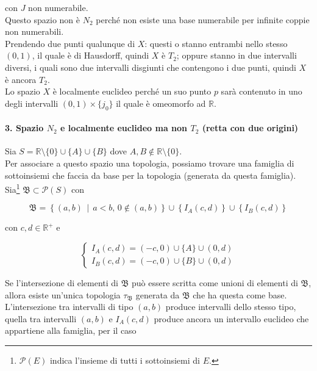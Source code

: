 con $ J $ non numerabile.\\
Questo spazio non è $ N_{2} $ perché non esiste una base numerabile per infinite coppie non numerabili.\\
Prendendo due punti qualunque di $ X $: questi o stanno entrambi nello stesso $ (0,1) $, il quale è di Hausdorff, quindi $ X $ è $ T_{2} $; oppure stanno in due intervalli diversi, i quali sono due intervalli disgiunti che contengono i due punti, quindi $ X $ è ancora $ T_{2} $.\\
Lo spazio $ X $ è localmente euclideo perché un suo punto $ p $ sarà contenuto in uno degli intervalli $ (0,1) \times \{j_{0}\} $ il quale è omeomorfo ad $ \mathbb{R} $.

\paragraph{3. Spazio $ N_{2} $ e localmente euclideo ma non $ T_{2} $ (retta con due origini)}

Sia $ S = \mathbb{R} \setminus \{0\} \cup \{A\} \cup \{B\} $ dove $ A,B \notin \mathbb{R} \setminus \{0\} $.\\ 
Per associare a questo spazio una topologia, possiamo trovare una famiglia di sottoinsiemi che faccia da base per la topologia (generata da questa famiglia). Sia\footnote{%
	$ \mathcal{P}(E) $ indica l'insieme di tutti i sottoinsiemi di $ E $.%
} $ \mathfrak{B} \subset \mathcal{P} (S) $ con

\begin{equation}
	\mathfrak{B} = \left\{ (a,b) \, \middle| \, a<b, \, 0 \notin (a,b) \right\} \cup \left\{ I_{A}(c,d) \right\} \cup \left\{ I_{B}(c,d) \right\}
\end{equation}

con $ c,d \in \mathbb{R}^{+} $ e

\begin{equation}
	\begin{cases}
		I_{A}(c,d) = (-c,0) \cup \{A\} \cup (0,d)\\
		I_{B}(c,d) = (-c,0) \cup \{B\} \cup (0,d)
	\end{cases}
\end{equation}

Se l'intersezione di elementi di $ \mathfrak{B} $ può essere scritta come unioni di elementi di $ \mathfrak{B} $, allora esiste un'unica topologia $ \tau_{\mathfrak{B}} $ generata da $ \mathfrak{B} $ che ha questa come base.\\
L'intersezione tra intervalli di tipo $ (a,b) $ produce intervalli dello stesso tipo, quella tra intervalli $ (a,b) $ e $ I_{A}(c,d) $ produce ancora un intervallo euclideo che appartiene alla famiglia, per il caso

